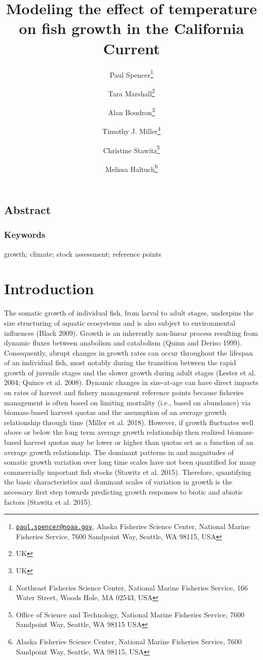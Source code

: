 \documentclass[
]{article}
\title{Modeling the effect of temperature on fish growth in the
California Current}
\author{Paul Spencer\footnote{\href{mailto:paul.spencer@noaa.gov}{\nolinkurl{paul.spencer@noaa.gov}},
  Alaska Fisheries Science Center, National Marine Fisheries Service,
  7600 Sandpoint Way, Seattle, WA 98115, USA} \and Tara
Marshall\footnote{UK} \and Alan Boudron\footnote{UK} \and Timothy J.
Miller\footnote{Northeast Fisheries Science Center, National Marine
  Fisheries Service, 166 Water Street, Woods Hole, MA 02543, USA} \and Christine
Stawitz\footnote{Office of Science and Technology, National Marine
  Fisheries Service, 7600 Sandpoint Way, Seattle, WA 98115 USA} \and Melissa
Haltuch\footnote{Alaska Fisheries Science Center, National Marine
  Fisheries Service, 7600 Sandpoint Way, Seattle, WA 98115, USA}}
\date{}
\begin{document}
\maketitle

\pagebreak

\hypertarget{abstract}{%
\subsection*{Abstract}\label{abstract}}

\hypertarget{keywords}{%
\subsubsection*{Keywords}\label{keywords}}

growth; climate; stock assessment; reference points

\pagebreak

\hypertarget{introduction}{%
\section{Introduction}\label{introduction}}

The somatic growth of individual fish, from larval to adult stages,
underpins the size structuring of aquatic ecosystems and is also subject
to environmental influences (Black 2009). Growth is an inherently
non-linear process resulting from dynamic fluxes between anabolism and
catabolism (Quinn and Deriso 1999). Consequently, abrupt changes in
growth rates can occur throughout the lifespan of an individual fish,
most notably during the transition between the rapid growth of juvenile
stages and the slower growth during adult stages (Lester et al. 2004;
Quince et al. 2008). Dynamic changes in size-at-age can have direct
impacts on rates of harvest and fishery management reference points
because fisheries management is often based on limiting mortality (i.e.,
based on abundance) via biomass-based harvest quotas and the assumption
of an average growth relationship through time (Miller et al. 2018).
However, if growth fluctuates well above or below the long term average
growth relationship then realized biomass-based harvest quotas may be
lower or higher than quotas set as a function of an average growth
relationship. The dominant patterns in and magnitudes of somatic growth
variation over long time scales have not been quantified for many
commercially important fish stocks (Stawitz et al. 2015). Therefore,
quantifying the basic characteristics and dominant scales of variation
in growth is the necessary first step towards predicting growth
responses to biotic and abiotic factors (Stawitz et al. 2015).
\end{document}
